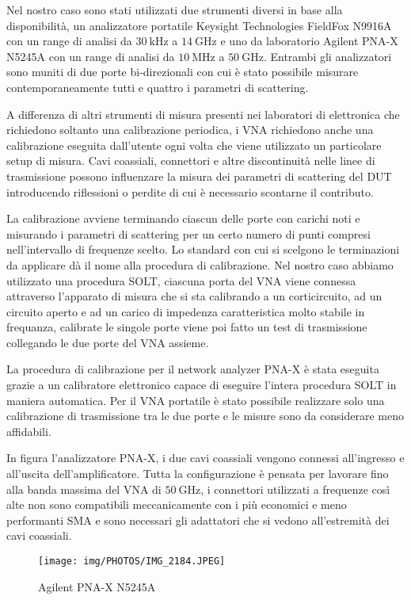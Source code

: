 \documentclass[12pt,oneside]{book}
\begin{document}
Nel nostro caso sono stati utilizzati due strumenti diversi in base alla disponibilità, un analizzatore portatile Keysight Technologies FieldFox N9916A con un range di analisi da $\SI{30}{\kilo\hertz}$ a $\SI{14}{\giga\hertz}$ e uno da laboratorio Agilent PNA-X N5245A con un range di analisi da $\SI{10}{\mega\hertz}$ a $\SI{50}{\giga\hertz}$. Entrambi gli analizzatori sono muniti di due porte bi-direzionali con cui è stato possibile misurare contemporaneamente tutti e quattro i parametri di scattering.

A differenza di altri strumenti di misura presenti nei laboratori di elettronica che richiedono soltanto una calibrazione periodica, i VNA richiedono anche una calibrazione eseguita dall'utente ogni volta che viene utilizzato un particolare setup di misura. Cavi coassiali, connettori e altre discontinuità nelle linee di trasmissione possono influenzare la misura dei parametri di scattering del DUT introducendo riflessioni o perdite di cui è necessario scontarne il contributo.

La calibrazione avviene terminando ciascun delle porte con carichi noti e misurando i parametri di scattering per un certo numero di punti compresi nell'intervallo di frequenze scelto. Lo standard con cui si scelgono le terminazioni da applicare dà il nome alla procedura di calibrazione. Nel nostro caso abbiamo utilizzato una procedura SOLT, ciascuna porta del VNA viene connessa attraverso l'apparato di misura che si sta calibrando a un corticircuito, ad un circuito aperto e ad un carico di impedenza caratteristica molto stabile in frequanza, calibrate le singole porte viene poi fatto un test di trasmissione collegando le due porte del VNA assieme.

La procedura di calibrazione per il network analyzer PNA-X è stata eseguita grazie a un calibratore elettronico capace di eseguire l'intera procedura SOLT in maniera automatica. Per il VNA portatile è stato possibile realizzare solo una calibrazione di trasmissione tra le due porte e le misure sono da considerare meno affidabili.

In figura l'analizzatore PNA-X, i due cavi coassiali vengono connessi all'ingresso e all'uscita dell'amplificatore. Tutta la configurazione è pensata per lavorare fino alla banda massima del VNA di $\SI{50}{\giga\hertz}$, i connettori utilizzati a frequenze così alte non sono compatibili meccanicamente con i più economici e meno performanti SMA e sono necessari gli adattatori che si vedono all'estremità dei cavi coassiali.
\begin{figure}[!htbp]
    \centering
        \texttt{[image: img/PHOTOS/IMG\_2184.JPEG]}
        \caption{Agilent PNA-X N5245A}
\end{figure}
\end{document}
